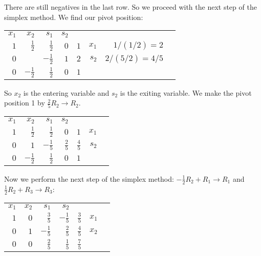 \documentclass[11pt,letterpaper]{article}
\begin{document}
There are still negatives in the last row. So we proceed with the next step of the simplex method. We find our pivot position: 

	\begin{table}[!ht]
	\centering
	\begin{tabular}{rrrrrrr r}
	{\small $x_1$} & {\small $x_2$} & {\small $s_1$} & {\small $s_2$} \\
	$1$ & $\frac{1}{2}$ & $\frac{1}{2}$ & \multicolumn{1}{r|}{$0$} & $1$ & {\small $x_1$} & {\small $1/(1/2)= 2$} \\
	$0$ &  \fbox{$\frac{5}{2}$} & $-\frac{1}{2}$ & \multicolumn{1}{r|}{$1$} & $2$ & {\small $s_2$} & {\small $2/(5/2)= 4/5$} \\ \cline{1-5}
	$0$ & \underline{$-\frac{1}{2}$} & $\frac{1}{2}$ & \multicolumn{1}{r|}{$0$} & $1$
	\end{tabular}
	\end{table}

So $x_2$ is the entering variable and $s_2$ is the exiting variable. We make the pivot position 1 by $\frac{2}{5}R_2 \to R_2$.

	\begin{table}[!ht]
	\centering
	\begin{tabular}{rrrrrrr}
	{\small $x_1$} & {\small $x_2$} & {\small $s_1$} & {\small $s_2$} \\
	$1$ & $\frac{1}{2}$ & $\frac{1}{2}$ & \multicolumn{1}{r|}{$0$} & $1$ & {\small $x_1$} \\
	$0$ & $1$ & $-\frac{1}{5}$ & \multicolumn{1}{r|}{$\frac{2}{5}$} & $\frac{4}{5}$ & {\small $s_2$} \\ \cline{1-5}
	$0$ & $-\frac{1}{2}$ & $\frac{1}{2}$ & \multicolumn{1}{r|}{$0$} & $1$ 
	\end{tabular}
	\end{table}

 Now we perform the next step of the simplex method: $-\frac{1}{2}R_2 + R_1 \to R_1$ and $\frac{1}{2}R_2 + R_3 \to R_3$:
	\begin{table}[!ht]
	\centering
	\begin{tabular}{rrrrrrr}
	{\small $x_1$} & {\small $x_2$} & {\small $s_1$} & {\small $s_2$} \\
	$1$ & $0$ & $\frac{3}{5}$ & \multicolumn{1}{r|}{$-\frac{1}{5}$} & $\frac{3}{5}$ & {\small $x_1$} \\
	$0$ & $1$ & $-\frac{1}{5}$ & \multicolumn{1}{r|}{$\frac{2}{5}$} & $\frac{4}{5}$ & {\small $x_2$} \\ \cline{1-5}
	$0$ & $0$ & $\frac{2}{5}$ & \multicolumn{1}{r|}{$\frac{1}{5}$} & $\frac{7}{5}$ 
	\end{tabular}
	\end{table}
\end{document}
